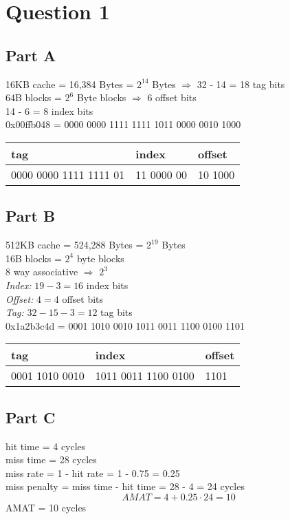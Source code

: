 \documentclass[12pt]{article}
\begin{document}
\section*{Question 1}
\subsection*{Part A}
16KB cache = 16,384 Bytes = $2^{14}$ Bytes $\Rightarrow$ 32 - 14 = 18 tag bits\\
64B blocks = $2^{6}$ Byte blocks $\Rightarrow$ 6 offset bits\\
14 - 6 = 8 index bits\\
0x00ffb048 = 0000 0000 1111 1111 1011 0000 0010 1000
\begin{table}[!h]
\centering
\begin{tabular}{|l|l|l|}
\hline
tag & index & offset \\ \hline
0000 0000 1111 1111 01 & 11 0000 00 & 10 1000 \\ \hline
\end{tabular}
\end{table}
\subsection*{Part B}
512KB cache = 524,288 Bytes = $2^{19}$ Bytes\\
16B blocks = $2^{4}$ byte blocks\\
8 way associative $\Rightarrow$ $2^3$\\
\textit{Index:} $19 - 3 = 16$ index bits\\
\textit{Offset:} $4= 4$ offset bits\\
\textit{Tag:} $32 - 15 - 3 = 12$ tag bits\\
0x1a2b3c4d = 0001 1010 0010 1011 0011 1100 0100 1101\\
\begin{table}[!h]
\centering
\begin{tabular}{|l|l|l|}
\hline
tag & index & offset \\ \hline
0001 1010 0010 & 1011 0011 1100 0100 & 1101 \\ \hline
\end{tabular}
\end{table}
\subsection*{Part C}
hit time = 4 cycles\\
miss time = 28 cycles\\
miss rate = 1 - hit rate = 1 - 0.75 = 0.25\\
miss penalty = miss time - hit time = 28 - 4 = 24 cycles\\
\[ AMAT = 4 + 0.25 \cdot 24 = 10 \]
AMAT = 10 cycles
\newpage
\end{document}
